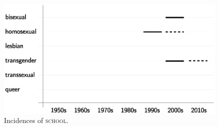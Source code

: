 \documentclass[10pt,a4paper,twocolumn]{scrartcl}
\begin{document}
\begin{figure}
\begin{minipage}{0.48\textwidth}
\includegraphics[width=\columnwidth]{figures/topic_school}
\caption{Incidences of \textsc{school}.} \label{fig:topic_school}
\end{minipage}
\end{figure}
\end{document}
